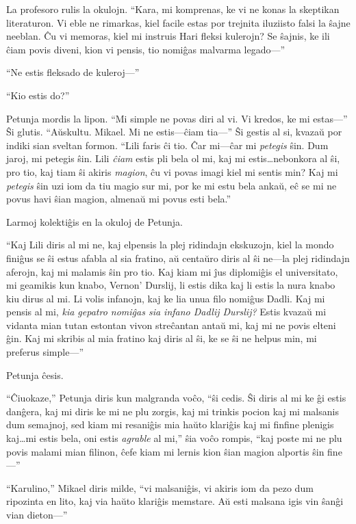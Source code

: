 La profesoro rulis la okulojn.
“Kara, mi komprenas, ke vi ne konas la skeptikan literaturon.
Vi eble ne rimarkas, kiel facile estas por trejnita iluziisto falsi la ŝajne neeblan.
Ĉu vi memoras, kiel mi instruis Hari fleksi kulerojn?
Se ŝajnis, ke ili ĉiam povis diveni, kion vi pensis, tio nomiĝas malvarma legado—”

“Ne estis fleksado de kuleroj—”

“Kio estis do?”

Petunja mordis la lipon.
“Mi simple ne povas diri al vi.
Vi kredos, ke mi estas—”
Ŝi glutis.
“Aŭskultu.
Mikael.
Mi ne estis—ĉiam tia—”
Ŝi gestis al si, kvazaŭ por indiki sian sveltan formon.
“Lili faris ĉi tio.
Ĉar mi—ĉar mi \emph{petegis} ŝin.
Dum jaroj, mi petegis ŝin.
Lili \emph{ĉiam} estis pli bela ol mi, kaj mi estis…nebonkora al ŝi, pro tio, kaj tiam ŝi akiris \emph{magion}, ĉu vi povas imagi kiel mi sentis min?
Kaj mi \emph{petegis} ŝin uzi iom da tiu magio sur mi, por ke mi estu bela ankaŭ, eĉ se mi ne povus havi ŝian magion, almenaŭ mi povus esti bela.”

Larmoj kolektiĝis en la okuloj de Petunja.

“Kaj Lili diris al mi ne, kaj elpensis la plej ridindajn ekskuzojn, kiel la mondo finiĝus se ŝi estus afabla al sia fratino, aŭ centaŭro diris al ŝi ne—la plej ridindajn aferojn, kaj mi malamis ŝin pro tio.
Kaj kiam mi ĵus diplomiĝis el universitato, mi geamikis kun knabo, Vernon' Durslij, li estis dika kaj li estis la nura knabo kiu dirus al mi.
Li volis infanojn, kaj ke lia unua filo nomiĝus Dadli.
Kaj mi pensis al mi, \emph{kia gepatro nomiĝas sia infano Dadlij Durslij?}
Estis kvazaŭ mi vidanta mian tutan estontan vivon streĉantan antaŭ mi, kaj mi ne povis elteni ĝin.
Kaj mi skribis al mia fratino kaj diris al ŝi, ke se ŝi ne helpus min, mi preferus simple—”

Petunja ĉesis.

“Ĉiuokaze,” Petunja diris kun malgranda voĉo, “ŝi cedis.
Ŝi diris al mi ke ĝi estis danĝera, kaj mi diris ke mi ne plu zorgis, kaj mi trinkis pocion kaj mi malsanis dum semajnoj, sed kiam mi resaniĝis mia haŭto klariĝis kaj mi finfine plenigis kaj…mi estis bela, oni estis \emph{agrable} al mi,” ŝia voĉo rompis, “kaj poste mi ne plu povis malami mian filinon, ĉefe kiam mi lernis kion ŝian magion alportis ŝin fine—”

“Karulino,” Mikael diris milde, “vi malsaniĝis, vi akiris iom da pezo dum ripozinta en lito, kaj via haŭto klariĝis memstare.
Aŭ esti malsana igis vin ŝanĝi vian dieton—”

